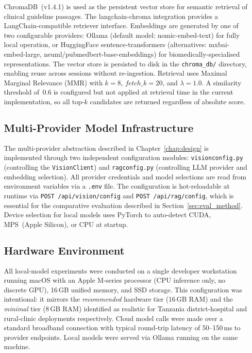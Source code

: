 \documentclass[12pt,a4paper]{report}
\begin{document}
	ChromaDB~(v1.4.1) is used as the persistent vector store for semantic
	retrieval of clinical guideline passages.  The langchain-chroma
	integration provides a LangChain-compatible retriever interface.
	Embeddings are generated by one of two configurable providers: Ollama
	(default model: nomic-embed-text) for fully local operation, or
	HuggingFace sentence-transformers (alternatives: mxbai-embed-large,
	neuml/pubmedbert-base-embeddings) for biomedically-specialised
	representations.  The vector store is persisted to disk in the
	\texttt{chroma\_db/} directory, enabling reuse across sessions without
	re-ingestion.  Retrieval uses Maximal Marginal Relevance (MMR) with
	$k{=}8$, $\mathit{fetch\_k}{=}20$, and $\lambda{=}1.0$.  A similarity
	threshold of~0.6 is configured but not applied at retrieval time in the
	current implementation, so all top-$k$ candidates are returned
	regardless of absolute score.
	
	\subsection{Multi-Provider Model Infrastructure}
	\label{subsec:providers}
	
	The multi-provider abstraction described in Chapter~\ref{chap:design} is implemented
	through two independent configuration modules: \texttt{visionconfig.py}
	(controlling the \texttt{VisionClient}) and \texttt{ragconfig.py}
	(controlling LLM provider and embedding selection).  All provider
	credentials and model selections are read from environment variables via
	a \texttt{.env} file.  The configuration is hot-reloadable at runtime
	via \texttt{POST /api/vision/config} and \texttt{POST /api/rag/config},
	which is essential for the comparative evaluation described in
	Section~\ref{sec:eval_method}.  Device selection for local models uses
	PyTorch to auto-detect CUDA, MPS~(Apple Silicon), or CPU at startup.
	
	\subsection{Hardware Environment}
	\label{subsec:hardware}
	
	All local-model experiments were conducted on a single developer
	workstation running macOS with an Apple M-series processor (CPU
	inference only, no discrete GPU), 16\,GB unified memory, and SSD
	storage.  This configuration was intentional: it mirrors the
	\textit{recommended} hardware tier (16\,GB RAM) and the
	\textit{minimal} tier (8\,GB RAM) identified as realistic for Tanzania
	district-hospital and rural-clinic deployments respectively.  Cloud
	model calls were made over a standard broadband connection with typical
	round-trip latency of 50--150\,ms to provider endpoints.  Local models
	were served via Ollama running on the same machine.
	
\end{document}
